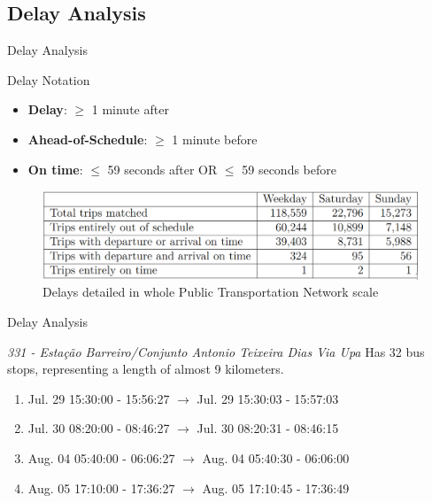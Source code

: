 \documentclass[xcolor=dvipsnames,table]{beamer}
\begin{document}
\subsection{Delay Analysis}
\begin{frame}{Delay Analysis}
        \begin{block}{Delay Notation}
                \begin{itemize}
                        \item \textbf{Delay}: $\geqslant$ 1 minute after
                        \item \textbf{Ahead-of-Schedule}: $\geqslant$ 1 minute before
                        \item \textbf{On time}: $\leqslant$ 59 seconds after OR $\leqslant$ 59 seconds before
                \end{itemize}
        \end{block}
        \begin{figure}[H]
                \centering
                \includegraphics[width=\textwidth]{images/delays_detailed.png}
                \caption{Delays detailed in whole Public Transportation Network scale}
        \end{figure}
\end{frame}
\begin{frame}{Delay Analysis}
        \begin{block}{\textit{331 - Estação Barreiro/Conjunto Antonio Teixeira Dias Via Upa}}
             Has 32 bus stops, representing a length of almost 9 kilometers.
                \begin{enumerate}
                        \item Jul. 29 15:30:00 - 15:56:27 $\longrightarrow$ Jul. 29 15:30:03 - 15:57:03
                        \item Jul. 30 08:20:00 - 08:46:27 $\longrightarrow$ Jul. 30 08:20:31 - 08:46:15
                        \item Aug. 04 05:40:00 - 06:06:27 $\longrightarrow$ Aug. 04 05:40:30 - 06:06:00
                        \item Aug. 05 17:10:00 - 17:36:27 $\longrightarrow$ Aug. 05 17:10:45 - 17:36:49
                \end{enumerate}
        \end{block}
\end{frame}
\end{document}
